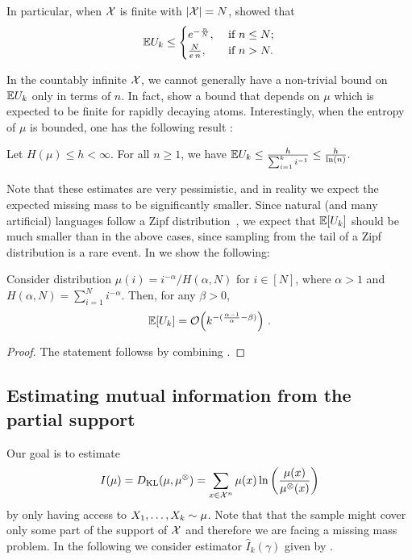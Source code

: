 In particular, when ${\mathcal{X}}$ is finite with $|{\mathcal{X}}|=N$, \citet{berend2012missing} showed that
\[
  \mathbb{E} U_k \leq
  \begin{cases}
    e^{-\frac{n}{N}}, & \text{ if } n \leq N;\\
    \frac{N}{e \, n}, & \text{ if } n > N.
  \end{cases}
\]

In the countably infinite ${\mathcal{X}}$, we cannot generally have a non-trivial bound on $\mathbb{E} U_k$ only in terms of $n$.
In fact, \citet{berend2012missing} show a bound that depends on $\mu$ which is expected to be finite for  rapidly decaying atoms.
Interestingly, when the entropy of $\mu$ is bounded, one has the following result \citep{berend2017expected}:
\begin{theorem}
  \label{thm:missing-mass-countable}
  Let $H(\mu) \leq h < \infty$.
  For all $n \geq 1$, we have $\mathbb{E} U_k \leq \frac{h}{\sum_{i=1}^k i^{-1}} \leq \frac{h}{\ln(n)}.$
\end{theorem}
%
Note that these estimates are very pessimistic, and in reality we expect the expected missing mass to be significantly smaller.
%
Since natural (and many artificial) languages follow a Zipf distribution~\citep{piantadosi2014zipf}, we expect that $\mathbb{E}[U_k]$ should be much smaller than in the above cases, since sampling from the tail of a Zipf distribution is a rare event.
%
In  we show the following:
\begin{corollary}
  Consider distribution $\mu(i) = i^{-\alpha} / H(\alpha, N)$ for $i \in [N]$, where $\alpha > 1$ and $H(\alpha, N) = \sum_{i=1}^N i^{-\alpha}$.
  Then, for any $\beta > 0$,
  \begin{align*}
    \mathbb{E}[U_k] = \mathcal{O}\Big(k^{-(\frac{\alpha-1}{\alpha} - \beta)} \Big)~.
  \end{align*}
\end{corollary}
\begin{proof}
  The statement followss by combining .
\end{proof}
%
%
\subsection{Estimating mutual information from the partial support}
%
Our goal is to estimate
\begin{align*}
  I (\mu) =
  D_{\mathrm{KL}}(\mu, \mu^{\otimes}) = \sum_{x \in {\mathcal{X}}^n} \mu(x) \ln\left( \frac{\mu(x)}{\mu^{\otimes}(x)} \right)
\end{align*}
%
by only having access to $X_1, \ldots, X_k \sim \mu$.
Note that that the sample might cover only some part of the support of ${\mathcal{X}}$ and therefore we are facing a missing mass problem.
In the following we consider estimator $\widehat I_k(\gamma)$ given by .
%
%


